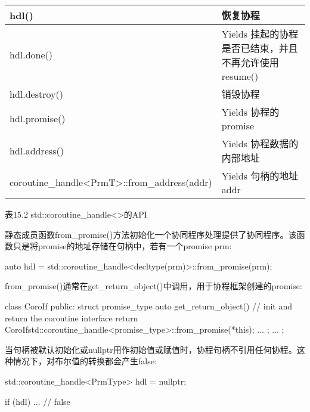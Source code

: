 \begin{longtable}[c]{|l|l|}
hdl()                                                                                  & 恢复协程                                                               \\ \hline
hdl.done()                                                                             & Yields 挂起的协程是否已结束，并且不再允许使用resume() \\ \hline
hdl.destroy()                                                                          & 销毁协程                                                                \\ \hline
hdl.promise()                                                                          & Yields 协程的promise                                                    \\ \hline
hdl.address()                                                                          & Yields 协程数据的内部地址                                     \\ \hline
coroutine\_handle\textless{}PrmT\textgreater{}::from\_address(addr)                    & Yields 句柄的地址addr                                             \\ \hline
\end{longtable}

\begin{center}
表15.2 std::coroutine\_handle<>的API
\end{center}

静态成员函数from\_promise()方法初始化一个协同程序处理提供了协同程序。该函数只是将promise的地址存储在句柄中，若有一个promise prm:

\begin{cpp}
auto hdl = std::coroutine_handle<decltype(prm)>::from_promise(prm);
\end{cpp}

from\_promise()通常在get\_return\_object()中调用，用于协程框架创建的promise:

\begin{cpp}
class CoroIf {
	public:
	struct promise_type {
		auto get_return_object() { // init and return the coroutine interface
			return CoroIf{std::coroutine_handle<promise_type>::from_promise(*this)};
		}
		...
	};
...
};
\end{cpp}

当句柄被默认初始化或nullptr用作初始值或赋值时，协程句柄不引用任何协程。这种情况下，对布尔值的转换都会产生false:

\begin{cpp}
std::coroutine_handle<PrmType> hdl = nullptr;

if (hdl) ... // false
\end{cpp}

